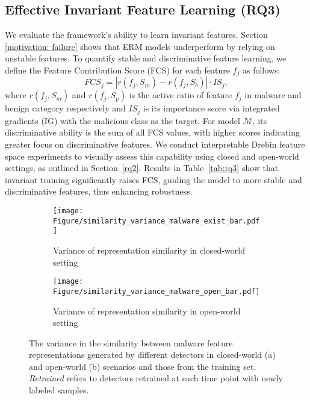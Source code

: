 \subsection{Effective Invariant Feature Learning (RQ3)}
\label{rq3}
We evaluate the framework’s ability to learn invariant features. Section \ref{motivation: failure} shows that ERM models underperform by relying on unstable features. To quantify stable and discriminative feature learning, we define the Feature Contribution Score (FCS) for each feature $f_j$ as follows:
\begin{equation}
    FCS_j = \left|r\left(f_j, S_m\right)-r\left(f_j, S_b\right)\right| \cdot IS_j,
\end{equation}
where $r(f_j, S_m)$ and $r(f_j, S_p)$ is the active ratio of feature $f_j$ in malware and benign category respectively and $IS_j$ is its importance score via integrated gradients (IG) with the malicious class as the target. For model $\mathcal{M}$, its discriminative ability is the sum of all FCS values, with higher scores indicating greater focus on discriminative features. We conduct interpretable Drebin feature space experiments to visually assess this capability using closed and open-world settings, as outlined in Section~\ref{rq2}. Results in Table~\ref{tab:rq3} show that invariant training significantly raises FCS, guiding the model to more stable and discriminative features, thus enhancing robustness.

\begin{figure}[hbt!]
    \centering
    \begin{subfigure}[t]{0.48\textwidth}  
        \texttt{[image: Figure/similarity\_variance\_malware\_exist\_bar.pdf]}
        \caption{Variance of representation similarity in closed-world setting}
    \end{subfigure}
    \begin{subfigure}[t]{0.48\textwidth}  
        \texttt{[image: Figure/similarity\_variance\_malware\_open\_bar.pdf]}
        \caption{Variance of representation similarity in open-world setting}
    \end{subfigure}
    \caption{The variance in the similarity between malware feature representations generated by different detectors in closed-world (a) and open-world (b) scenarios and those from the training set. \textit{Retrained} refers to detectors retrained at each time point with newly labeled samples.}
    \label{fig:rq2}
\end{figure}

